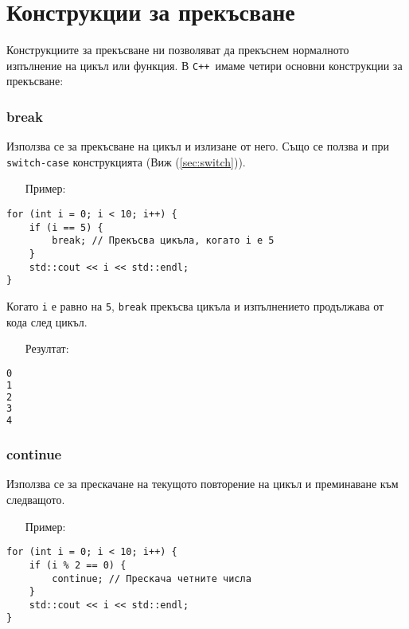 \documentclass[oneside]{book}
\newcommand*{\code}[1]{\texttt{#1}}
\newcommand*{\cpp}{\texttt{C++}\ }
\begin{document}
\section{Конструкции за прекъсване}
Конструкциите за прекъсване ни позволяват да прекъснем нормалното изпълнение на цикъл или функция. В \cpp имаме четири основни конструкции за прекъсване:

\subsubsection{break}
Използва се за прекъсване на цикъл и излизане от него. Също се ползва и при \code{switch-case} конструкцията (Виж (\ref{sec:switch})).

\begin{itemize}\item[Пример:]\end{itemize}
\begin{mdframed}\begin{lstlisting}
for (int i = 0; i < 10; i++) {
    if (i == 5) {
        break; // Прекъсва цикъла, когато i е 5
    }
    std::cout << i << std::endl;
}
\end{lstlisting}\end{mdframed}

Когато \code{i} е равно на \code{5}, \code{break} прекъсва цикъла и изпълнението продължава от кода след цикъл.

\begin{itemize}\item[Резултат:]\end{itemize}
\begin{mdframed}\begin{lstlisting}[language=bash]
0
1
2
3
4
\end{lstlisting}\end{mdframed}

\subsubsection{continue}
Използва се за прескачане на текущото повторение на цикъл и преминаване към следващото.

\begin{itemize}\item[Пример:]\end{itemize}
\begin{mdframed}\begin{lstlisting}
for (int i = 0; i < 10; i++) {
    if (i % 2 == 0) {
        continue; // Прескача четните числа
    }
    std::cout << i << std::endl;
}
\end{lstlisting}\end{mdframed}
\end{document}
